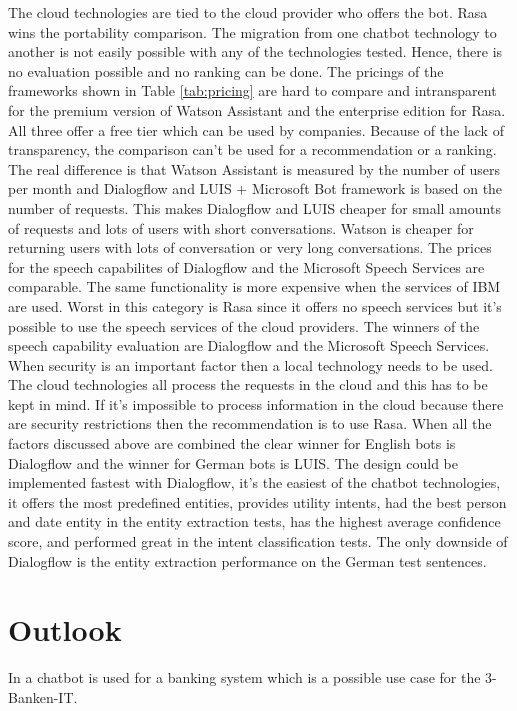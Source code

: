 The cloud technologies are tied to the cloud provider who offers the bot.
Rasa wins the portability comparison.
The migration from one chatbot technology to another is not easily possible with 
any of the technologies tested. 
Hence, there is no evaluation possible and no ranking can be done.
The pricings of the frameworks shown in Table \ref{tab:pricing} are hard to compare and intransparent for the premium version of Watson Assistant and the enterprise edition for Rasa.
All three offer a free tier which can be used by companies.
Because of the lack of transparency, the comparison can't be used for a recommendation or a ranking.
The real difference is that Watson Assistant is measured by the number of users per month and 
Dialogflow and LUIS + Microsoft Bot framework is based on the number of requests.
This makes Dialogflow and LUIS cheaper for small amounts of requests and lots of users with short conversations.
Watson is cheaper for returning users with lots of conversation or very long conversations.
The prices for the speech capabilites of Dialogflow and the Microsoft Speech Services are comparable.
The same functionality is more expensive when the services of IBM are used.
Worst in this category is Rasa since it offers no speech services but it's possible to use the 
speech services of the cloud providers.
The winners of the speech capability evaluation are Dialogflow and the Microsoft Speech Services.
When security is an important factor then a local technology needs to be used.
The cloud technologies all process the requests in the cloud and this has to be 
kept in mind.
If it's impossible to process information in the cloud because there are security restrictions
then the recommendation is to use Rasa.
When all the factors discussed above are combined the clear winner for English bots is Dialogflow and the 
winner for German bots is LUIS.
The design could be implemented fastest with Dialogflow, it's the easiest of the chatbot technologies,
it offers the most predefined entities, provides utility intents, had the best person and date
entity in the entity extraction tests, has the highest average confidence score, 
and performed great in the intent classification tests.
The only downside of Dialogflow is the entity extraction performance on the German test sentences.



\section{Outlook}
In \citet{singhbuilding} a chatbot is used for a banking system which is a possible use case for the 3-Banken-IT.

